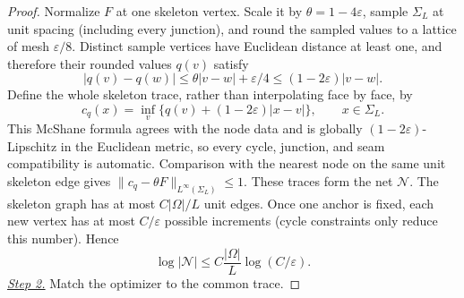 \documentclass{aomart}
\theoremstyle{definition}
\newcommand{\1}{\mathbf 1}
\begin{document}
\begin{proof}
Normalize $F$ at one skeleton vertex.  Scale it by
$\theta=1-4\varepsilon$, sample $\Sigma_ L$ at unit spacing (including
every junction), and round the sampled values to a lattice of mesh
$\varepsilon/8$.  Distinct sample vertices have Euclidean distance at
least one, and therefore their rounded values $q(v)$ satisfy
\begin{equation*}
|q(v)-q(w)|\leq\theta|v-w|+\varepsilon/4
\leq(1-2\varepsilon)|v-w|.
\end{equation*}
Define the whole skeleton trace, rather than interpolating face by face, by
\begin{equation}
c_ q(x)=\inf_ v\{q(v)+(1-2\varepsilon)|x-v|\},
\qquad x\in\Sigma_ L.
\tag{20a}
\end{equation}
This McShane formula agrees with the node data and is globally
$(1-2\varepsilon)$-Lipschitz in the Euclidean metric, so every cycle,
junction, and seam compatibility is automatic.  Comparison with the
nearest node on the same unit skeleton edge gives
$\|c_ q-\theta F\|_ {L^\infty(\Sigma_ L)}\leq1$.
These traces form the net $\mathcal N$.
The skeleton graph has at most $C|\Omega|/L$ unit edges.  Once one
anchor is fixed, each new vertex has at most $C/\varepsilon$ possible
increments (cycle constraints only reduce this number).  Hence
\begin{equation}
\log|\mathcal N|
\leq C\frac{|\Omega|}{L}\log(C/\varepsilon).
\tag{21}
\end{equation}
\smallskip\noindent
\underline{\textit{Step 2.}} Match the optimizer to the common trace.


\end{proof}
\end{document}
